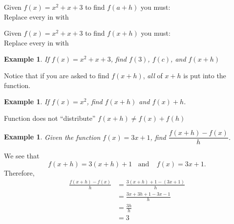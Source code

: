 \documentclass[twoside]{tufte-handout}
\newcounter{ekcounter}%
\theoremstyle{ekimcustom}
\newtheorem{exm}[ekcounter]{Example}
\begin{document}
\vskip80pt

Given $f(x)=x^2+x+3$ to find $f(a+h)$ you must:\\
Replace every \fbox{\phantom{...AAAAA.A........}} in \fbox{\phantom{....A..AAAAA......}} with \fbox{\phantom{......AA......}}

\vskip20pt

Given $f(x)=x^2+x+3$ to find $f(x+h)$ you must:\\
Replace every \fbox{\phantom{...AAAAA.A........}} in \fbox{\phantom{....A..AAAAA......}} with \fbox{\phantom{......AA......}}



\begin{exm}{If $f(x)=x^2+x+3$, find $f(3)$, $f(c)$, and $f(x+h)$}
\end{exm}\vskip10pt

 Notice that if you are asked to find $f(x+h)$, {\it all} of $x+h$ is put into the function.

\everymath{\displaystyle}
\begin{exm}{If $f(x)=x^2$, find $f(x+h)$ and $f(x)+h$.}
\end{exm}\vskip10pt
 
\begin{bwarning}{Function does not ``distribute''}{}
$f(x+h) \not= f(x)+f(h)$
\end{bwarning}



\begin{exm}
Given the function $f(x)=3x+1$, find $\dfrac{f(x+h)-f(x)}{h}$.
\end{exm}
We see that 
$$f(x+h)=3(x+h)+1 ~~~~\mbox{and}~~~~~ f(x)=3x+1.$$
Therefore, 
\begin{align*}
    \frac{f(x+h)-f(x)}{h}&=\frac{3(x+h)+1-(3x+1)}{h}\\
    &=\frac{3x+3h+1-3x-1}{h}\\
    &=\frac{3h}{h}\\
    &=3\\
\end{align*}

\vskip10pt

\end{document}
